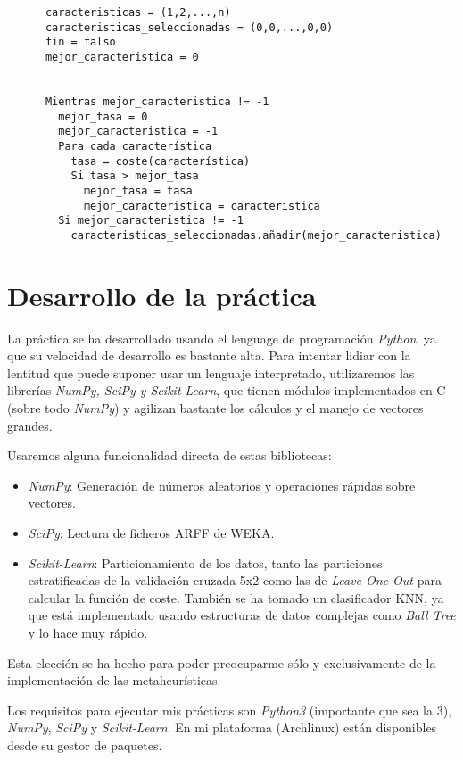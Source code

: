 \documentclass[a4paper, 11pt]{article}
\begin{document}
    \begin{verbatim}
      caracteristicas = (1,2,...,n)
      caracteristicas_seleccionadas = (0,0,...,0,0)
      fin = falso
      mejor_caracteristica = 0


      Mientras mejor_caracteristica != -1
        mejor_tasa = 0
        mejor_caracteristica = -1
        Para cada característica
          tasa = coste(característica)
          Si tasa > mejor_tasa
            mejor_tasa = tasa
            mejor_caracteristica = caracteristica
        Si mejor_caracteristica != -1
          caracteristicas_seleccionadas.añadir(mejor_caracteristica)
    \end{verbatim}
  \section{Desarrollo de la práctica}
    La práctica se ha desarrollado usando el lenguage de programación \emph{Python}, ya que su velocidad de desarrollo es bastante alta. Para intentar lidiar con la lentitud que puede suponer usar un lenguaje interpretado, utilizaremos las librerías \emph{NumPy, SciPy y Scikit-Learn}, que tienen módulos implementados en C (sobre todo \emph{NumPy}) y agilizan bastante los cálculos y el manejo de vectores grandes.

    Usaremos alguna funcionalidad directa de estas bibliotecas:
    \begin{itemize}
      \item \emph{NumPy}: Generación de números aleatorios y operaciones rápidas sobre vectores.
      \item \emph{SciPy}: Lectura de ficheros ARFF de WEKA.
      \item \emph{Scikit-Learn}: Particionamiento de los datos, tanto las particiones estratificadas de la validación cruzada 5x2 como las de \emph{Leave One Out} para calcular la función de coste. También se ha tomado un clasificador KNN, ya que está implementado usando estructuras de datos complejas como \emph{Ball Tree} y lo hace muy rápido.
    \end{itemize}

    Esta elección se ha hecho para poder preocuparme sólo y exclusivamente de la implementación de las metaheurísticas.

    Los requisitos para ejecutar mis prácticas son \emph{Python3} (importante que sea la 3), \emph{NumPy}, \emph{SciPy} y \emph{Scikit-Learn}. En mi plataforma (Archlinux) están disponibles desde su gestor de paquetes.
\end{document}
